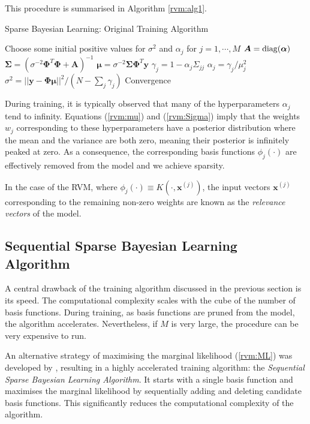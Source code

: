 This procedure is summarised in Algorithm \ref{rvm:alg1}.
\begin{algorithm}
  \caption{Sparse Bayesian Learning: Original Training Algorithm}
  \label{rvm:alg1}
  \begin{algorithmic}[1]
    \State Choose some initial positive values for $\sigma^2$ and $\alpha_j$ for $j=1,\cdots,M$ 
    \Repeat
    \State $\bm A = \operatorname*{diag}(\bm\alpha)$
    \State $\bm\Sigma = \left(\sigma^{-2}\bm\Phi^T\bm\Phi + \bm A\right)^{-1}$
    \State $\bm\mu = \sigma^{-2}\bm\Sigma\bm\Phi^T\bm y$
    \Statex
    \State $\gamma_j = 1 - \alpha_j \Sigma_{jj}$
    \State $\alpha_j = \gamma_j/\mu_j^2$
    \EndFor
    \State $\sigma^2 =||\bm y - \bm\Phi\bm\mu||^2 / (N - \sum_j\gamma_j)$
    \Until Convergence
  \end{algorithmic}
\end{algorithm}

During training, it is typically observed that many of the hyperparameters $\alpha_j$ tend to infinity.
Equations (\ref{rvm:mu}) and (\ref{rvm:Sigma}) imply that the weights $w_j$ corresponding to these hyperparameters have a posterior distribution where the mean and the variance are both zero, meaning their posterior is infinitely peaked at zero.
As a consequence, the corresponding basis functions $\phi_j(\cdot)$ are effectively removed from the model and we achieve sparsity.

In the case of the RVM, where $\phi_j(\cdot) \equiv K(\cdot, \bm x^{(j)})$, the input vectors $\bm x^{(j)}$ corresponding to the remaining non-zero weights are known as the \emph{relevance vectors} of the model.

\subsection{Sequential Sparse Bayesian Learning Algorithm}
A central drawback of the training algorithm discussed in the previous section is its speed. 
The computational complexity scales with the cube of the number of basis functions.
During training, as basis functions are pruned from the model, the algorithm accelerates.
Nevertheless, if $M$ is very large, the procedure can be very expensive to run.

An alternative strategy of maximising the marginal likelihood (\ref{rvm:ML}) was developed by \cite{tipping2003}, resulting in a highly accelerated training algorithm: the \emph{Sequential Sparse Bayesian Learning Algorithm}.
It starts with a single basis function and maximises the marginal likelihood by sequentially adding and deleting candidate basis functions.
This significantly reduces the computational complexity of the algorithm.


